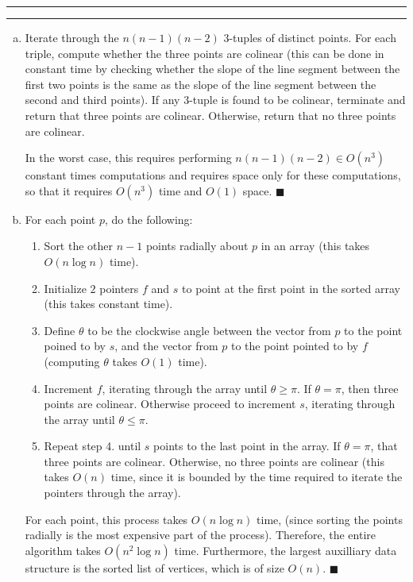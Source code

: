 \documentclass[11pt]{article}
\newcounter{questionCounter}
\newcounter{partCounter}[questionCounter]
\newenvironment{question}[2][\arabic{questionCounter}]{%
    \setcounter{partCounter}{0}%
    \vspace{.25in} \hrule \vspace{0.5em}%
        \noindent{\bf #2}%
    \vspace{0.8em} \hrule \vspace{.10in}%
    \addtocounter{questionCounter}{1}%
}{}
\begin{document}
\begin{question}{Collinearity}
\begin{enumerate}[(a)]
\item Iterate through the $n(n - 1)(n - 2)$ 3-tuples of distinct points. For
each triple, compute whether the three points are colinear (this can be done
in constant time by checking whether the slope of the line segment between the
first two points is the same as the slope of the line segment between the
second and third points). If any 3-tuple is found to be colinear, terminate
and return that three points are colinear. Otherwise, return that no three
points are colinear.

In the worst case, this requires performing $n(n - 1)(n - 2) \in O(n^3)$
constant times computations and requires space only for these computations,
so that it requires $O(n^3)$ time and $O(1)$ space. \qquad $\blacksquare$

\item For each point $p$, do the following:
\begin{enumerate}[1.]
\item Sort the other $n - 1$ points radially about $p$ in an array (this takes
$O(n \log n)$ time).
\item Initialize $2$ pointers $f$ and $s$ to point at the first point in the
sorted array (this takes constant time).
\item Define $\theta$ to be the clockwise angle between the vector from $p$ to
the point poined to by $s$, and the vector from $p$ to the point pointed to by
$f$ (computing $\theta$ takes $O(1)$ time).
\item Increment $f$, iterating through the array until $\theta \geq \pi$. If
$\theta = \pi$, then three points are colinear. Otherwise proceed
to increment $s$, iterating through the array until $\theta \leq \pi$.
\item Repeat step 4. until $s$ points to the last point in the array. If
$\theta = \pi$, that three points are colinear. Otherwise,
no three points are colinear (this takes $O(n)$ time, since it is bounded by
the time required to iterate the pointers through the array).
\end{enumerate}
For each point, this process takes $O(n \log n)$ time, (since sorting the points
radially is the most expensive part of the process). Therefore, the entire
algorithm takes $O(n^2 \log n)$ time. Furthermore, the largest auxilliary data
structure is the sorted list of vertices, which is of size $O(n)$.
\qquad $\blacksquare$


\end{enumerate}
\end{question}
\end{document}

